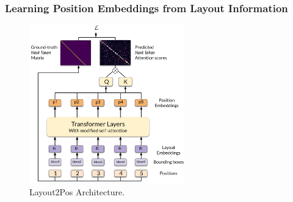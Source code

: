 

\subsubsection{Learning Position Embeddings from Layout Information}

\begin{figure}
  \centering
  \includegraphics[width=0.6\textwidth]{images/chapter4/Layout2Pos_bis.pdf}
  \caption{Layout2Pos Architecture.}
  \label{fig:layout2pos-module}
\end{figure}

